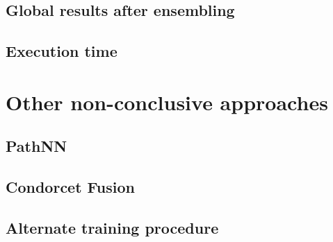 \documentclass[switch, 12pt]{article}
\begin{document}
\begin{multicols}{2}
    \subsection{Global results after ensembling}
    \subsection{Execution time}

    \section{Other non-conclusive approaches}
    \label{sec:non-conclusive}
    \subsection{PathNN}
    \subsection{Condorcet Fusion}
    \subsection{Alternate training procedure}

    \newpage

    

\end{multicols}
\end{document}
